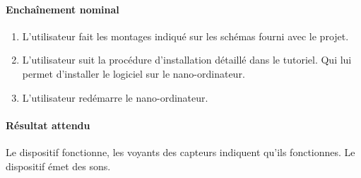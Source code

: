 \documentclass[a4paper, titlepage, oneside, 12pt]{article}%
\begin{document}
\paragraph{Enchaînement nominal}
\begin {enumerate}
\item L'utilisateur fait les montages indiqué sur les schémas fourni avec le projet.
\item L'utilisateur suit la procédure d'installation détaillé dans le tutoriel. Qui lui permet d'installer le logiciel sur le nano-ordinateur.
\item L'utilisateur redémarre le nano-ordinateur.
\end{enumerate}

\paragraph{Résultat attendu\\}
Le dispositif fonctionne, les voyants des capteurs indiquent qu'ils fonctionnes. Le dispositif émet des sons.
\end{document}
